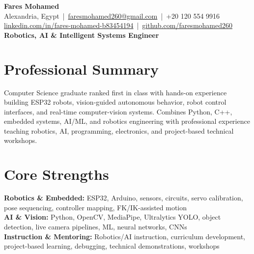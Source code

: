 \documentclass[letterpaper]{article}
\begin{document}
\footnotesize
\begin{center}
{\LARGE \textbf{Fares Mohamed}}\\[3pt]
Alexandria, Egypt \,|\, \href{mailto:faresmohamed260@gmail.com}{faresmohamed260@gmail.com} \,|\, +20 120 554 9916\\
\href{https://www.linkedin.com/in/fares-mohamed-b83454194/}{linkedin.com/in/fares-mohamed-b83454194} \,|\, \href{https://github.com/faresmohamed260}{github.com/faresmohamed260}\\
\textbf{Robotics, AI \& Intelligent Systems Engineer}
\end{center}

\section*{Professional Summary}
Computer Science graduate ranked first in class with hands-on experience building ESP32 robots, vision-guided autonomous behavior, robot control interfaces, and real-time computer-vision systems. Combines Python, C++, embedded systems, AI/ML, and robotics engineering with professional experience teaching robotics, AI, programming, electronics, and project-based technical workshops.

\section*{Core Strengths}
\textbf{Robotics \& Embedded:} ESP32, Arduino, sensors, circuits, servo calibration, pose sequencing, controller mapping, FK/IK-assisted motion\\
\textbf{AI \& Vision:} Python, OpenCV, MediaPipe, Ultralytics YOLO, object detection, live camera pipelines, ML, neural networks, CNNs\\
\textbf{Instruction \& Mentoring:} Robotics/AI instruction, curriculum development, project-based learning, debugging, technical demonstrations, workshops
\end{document}
